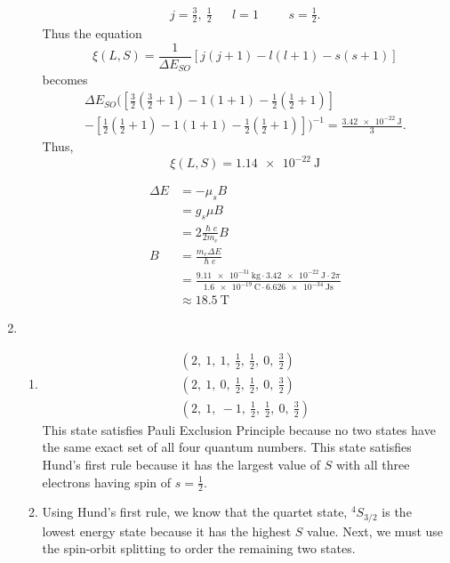 \documentclass[10pt]{article}
\begin{document}
\begin{enumerate}
\begin{enumerate}
    \begin{align*}
      j=\frac{3}{2},~\frac{1}{2} && l=1 &&& s=\frac{1}{2}
    .\end{align*}
    Thus the equation 
    \[
      \xi \left( L,S \right) = \frac{1}{\Delta E_{SO}} \left[ j\left(j+1\right)-l\left(l+1\right)-s\left(s+1\right) \right]
    \]
    becomes 
    \begin{multline*}
      \Delta E_{SO} \biggl( \left[ \frac{3}{2} \left( \frac{3}{2} + 1 \right) - 1 \left( 1+1 \right) - \frac{1}{2} \left( \frac{1}{2} + 1 \right) \right] \\
      - \left[ \frac{1}{2} \left( \frac{1}{2} + 1 \right) - 1 \left( 1+1 \right) - \frac{1}{2} \left( \frac{1}{2} + 1 \right) \right] \biggr)^{-1} = \frac{\qty{3.42e-22}{\joule}}{3} 
    .\end{multline*}
    Thus, 
    \[
      \xi \left( L,S \right) = \qty{1.14e-22}{\joule}
    \]

    \begin{align*}
      \Delta E &= -\mu_s B \\
               &= g_s \mu B \\
               &=2 \frac{\hslash e}{2m_e}B \\
            B  &= \frac{m_e \Delta E}{\hslash e} \\
            &= \frac{\qty{9.11e-31}{\kg}\cdot \qty{3.42e-22}{\joule} \cdot 2\pi}{\qty{1.6e-19}{\coulomb} \cdot \qty{6.626e-34}{\joule\second}} \\
            &\approx \qty{18.5}{\tesla}
    \end{align*}
  \end{enumerate}
\item
  \begin{enumerate}
  \item
    \begin{gather*}
    \left( 2,~1,~1,~\frac{1}{2},~\frac{1}{2},~0,~\frac{3}{2} \right) \\
    \left( 2,~1,~0,~\frac{1}{2},~\frac{1}{2},~0,~\frac{3}{2} \right) \\
    \left( 2,~1,~-1,~\frac{1}{2},~\frac{1}{2},~0,~\frac{3}{2} \right)
    \end{gather*}
    This state satisfies Pauli Exclusion Principle because no two states have the same exact set of all four quantum numbers.
    This state satisfies Hund's first rule because it has the largest value of $ S $ with all three electrons having spin of $ s=\frac{1}{2} $.
  \item
    Using Hund's first rule, we know that the quartet state, $ ^4S_{3 / 2} $ is the lowest energy state because it has the highest $ S $ value.
    Next, we must use the spin-orbit splitting to order the remaining two states.


\end{enumerate}
\end{enumerate}
\end{document}
